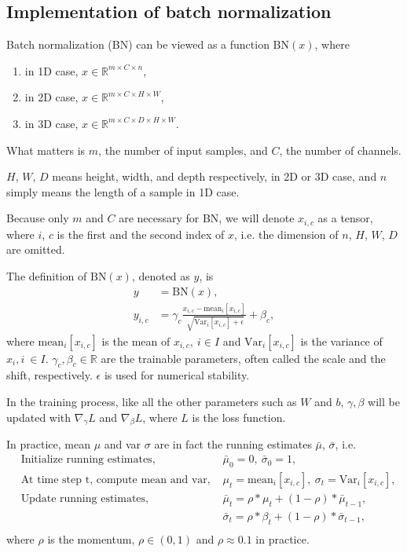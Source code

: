 \subsection{Implementation of batch normalization}
Batch normalization (BN) can be viewed as a function $\text{BN}(x)$, where

\begin{enumerate}
	\item in 1D case, $x\in\mathbb{R}^{m\times C\times n}$,
	\item in 2D case, $x\in\mathbb{R}^{m\times C\times H \times W}$,
	\item in 3D case, $x\in \mathbb{R}^{m\times C\times D \times H \times W}$.
\end{enumerate}
What matters is $m$, the number of input samples, and $C$, the number of channels.

$H$, $W$, $D$ means height, width, and depth respectively, in 2D or 3D case, and $n$ simply means the length of a sample in 1D case.

Because only $m$ and $C$ are necessary for BN, we will denote $x_{i,c}$ as a tensor, where $i$, $c$ is the first and the second index of $x$, i.e. the dimension of $n$, $H$, $W$, $D$ are omitted.

The definition of $\text{BN}(x)$, denoted as $y$, is
\begin{equation}
	\begin{aligned}
		y&=\text{BN}(x),\\
		y_{i,c}&=\gamma_c\frac{x_{i,c}-\text{mean}_i[x_{i,c}]}{\sqrt[]{\text{Var}_i[x_{i,c}]+\epsilon}}+\beta_c,
	\end{aligned}
\end{equation}
where $\text{mean}_i[x_{i,c}]$ is the mean of $x_{i,c},\ i\in I$ and $\text{Var}_i[x_{i,c}]$ is the variance of $x_i, i\ \in I$. $\gamma_c,\beta_c\in\mathbb{R}$ are the trainable parameters, often called the scale and the shift, respectively. $\epsilon$ is used for numerical stability.

In the training process, like all the other parameters such as $W$ and $b$, $\gamma,\beta$ will be updated with $\nabla_\gamma L$ and $\nabla_\beta L$, where $L$ is the loss function. 

In practice, mean $\mu$ and var $\sigma$ are in fact the running estimates $\bar\mu$, $\bar\sigma$, i.e. 
\begin{equation}
	\begin{aligned}
		&\text{Initialize running estimates, }&\bar\mu_0=0,\ \bar\sigma_0=1,\\
		&\text{At time step t, compute mean and var, }&\mu_t=\text{mean}_i[x_{i,c}],\ \sigma_t=\text{Var}_i[x_{i,c}],\\
		&\text{Update running estimates, }&\bar\mu_t=\rho*\mu_t+(1-\rho)*\bar\mu_{t-1},\\
		&&\bar\sigma_t=\rho*\beta_t+(1-\rho)*\bar\sigma_{t-1},\\
	\end{aligned}
\end{equation}
where $\rho$ is the momentum, $\rho\in(0,1)$ and $\rho\approx 0.1$ in practice.

